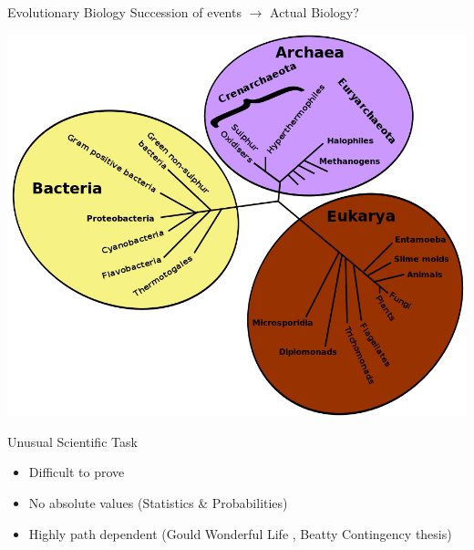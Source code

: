 \documentclass[12pt, notes=show]{beamer}
\begin{document}
\begin{frame}{Evolutionary Biology}
Succession of events $\rightarrow$ Actual Biology?
	\begin{center}
	    \includegraphics[width=.8\textheight]{images/treeOfLife.png}
	\end{center}
\end{frame}
\begin{frame}{Unusual Scientific Task}
    \vfill
    \begin{itemize}
	\item Difficult to prove
	    \vfill
	\item No absolute values (Statistics \& Probabilities)
	    \vfill
	\item  Highly path dependent (Gould Wonderful Life , Beatty Contingency thesis)
    \end{itemize}
    \vfill
\end{frame}
\end{document}
